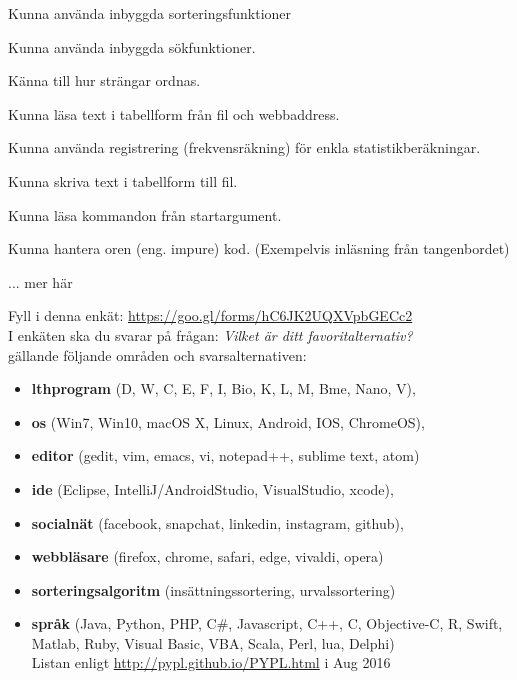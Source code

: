 

\Lab{\LabWeekTEN}

\begin{Goals}
\item Kunna använda inbyggda sorteringsfunktioner
\item Kunna använda inbyggda sökfunktioner.
\item Känna till hur strängar ordnas.
\item Kunna läsa text i tabellform från fil och webbaddress.
\item Kunna använda registrering (frekvensräkning) för enkla statistikberäkningar.
\item Kunna skriva text i tabellform till fil.
\item Kunna läsa kommandon från startargument.
\item Kunna hantera oren (eng. impure) kod. (Exempelvis inläsning från tangenbordet)
\item ... \TODO mer här
\end{Goals}

\begin{Preparations}
\item {}
\item {}
\item \ReadTheLab
\item Fyll i denna enkät: \url{https://goo.gl/forms/hC6JK2UQXVpbGECc2}  \\
I enkäten ska du svarar på frågan: \textit{Vilket är ditt favoritalternativ?} \\
gällande följande områden och svarsalternativen:
\begin{itemize}[nolistsep,noitemsep]
\item \textbf{lthprogram} (D, W, C, E, F, I, Bio, K, L, M, Bme, Nano, V), 
\item \textbf{os} (Win7, Win10, macOS X, Linux, Android, IOS, ChromeOS), 
\item \textbf{editor} (gedit, vim, emacs, vi, notepad++, sublime text, atom)
\item \textbf{ide} (Eclipse, IntelliJ/AndroidStudio, VisualStudio, xcode), 
\item \textbf{socialnät} (facebook, snapchat, linkedin, instagram, github), 
\item \textbf{webbläsare} (firefox, chrome, safari, edge, vivaldi, opera)
\item \textbf{sorteringsalgoritm} (insättningssortering, urvalssortering)
\item \textbf{språk} (Java, Python, PHP, C\#, Javascript, C++, C, Objective-C, R, Swift, Matlab, Ruby, Visual Basic, VBA, Scala, Perl, lua, Delphi)  \\
Listan enligt \url{http://pypl.github.io/PYPL.html} i Aug 2016
\end{itemize}
\end{Preparations}


